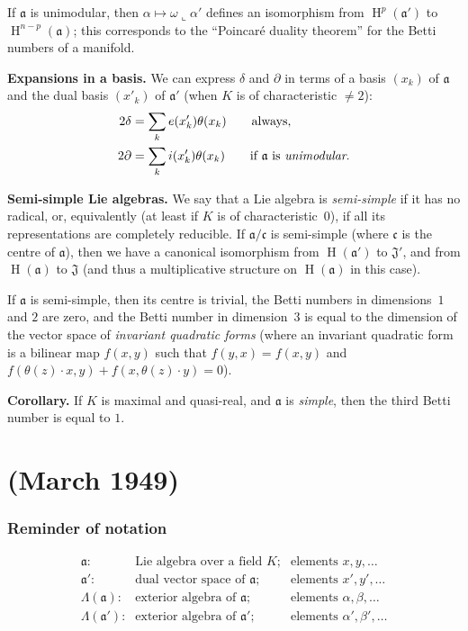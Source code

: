 \documentclass{article}
\newcommand{\llp}{\mathbin{\llcorner}}
\newcommand{\fk}{\mathfrak}
\DeclareMathOperator{\HH}{H}
\newcommand{\oldpage}[1]{\marginpar{\footnotesize$\Big\vert$ \textit{p.~#1}}}
\begin{document}
If $\fk{a}$ is unimodular, then $\alpha\mapsto\omega\llp\alpha'$ defines an isomorphism from $\HH^p(\fk{a}')$ to $\HH^{n-p}(\fk{a})$;
this corresponds to the ``Poincar\'{e} duality theorem'' for the Betti numbers of a manifold.

\medskip
\textbf{Expansions in a basis.}
We can express $\delta$ and $\partial$ in terms of a basis $(x_k)$ of $\fk{a}$ and the dual basis $(x'_k)$ of $\fk{a}'$ (when $K$ is of characteristic $\neq2$):
\[
  \begin{aligned}
    2\delta
    &= \sum_k e(x'_k)\theta(x_k)
    \qquad\mbox{always,}
  \\2\partial
    &= \sum_k i(x'_k)\theta(x_k)
    \qquad\mbox{if $\fk{a}$ is \emph{unimodular}.}
  \end{aligned}
\]

\medskip
\textbf{Semi-simple Lie algebras.}
We say that a Lie algebra is \emph{semi-simple} if it has no radical, or, equivalently (at least if $K$ is of characteristic~$0$), if all its representations are completely reducible.
If $\fk{a}/\fk{c}$ is semi-simple (where $\fk{c}$ is the centre of $\fk{a}$), then we have a canonical isomorphism from $\HH(\fk{a}')$ to $\fk{J}'$, and from $\HH(\fk{a})$ to $\fk{J}$ (and thus a multiplicative structure on $\HH(\fk{a})$ in this case).

If $\fk{a}$ is semi-simple, then its centre is trivial, the Betti numbers in dimensions~$1$ and $2$ are zero, and the Betti number in dimension~$3$ is equal to the dimension of the vector space of \emph{invariant quadratic forms} (where an invariant quadratic form is a bilinear map $f(x,y)$ such that $f(y,x)=f(x,y)$ and $f(\theta(z)\cdot x,y)+f(x,\theta(z)\cdot y)=0$).

\medskip
\textbf{Corollary.}
If $K$ is maximal and quasi-real, and $\fk{a}$ is \emph{simple}, then the third Betti number is equal to $1$.



\part{(March 1949)}
\label{II}

\oldpage{45}
\section{Reminder of notation}
\label{II.1}

\[
  \begin{array}{rll}
    \mbox{$\fk{a}$:} & \mbox{Lie algebra over a field $K$;} & \mbox{elements $x,y,\ldots$}
  \\\mbox{$\fk{a}'$:} & \mbox{dual vector space of $\fk{a}$;} & \mbox{elements $x',y',\ldots$}
  \\\mbox{$\Lambda(\fk{a})$:} & \mbox{exterior algebra of $\fk{a}$;} & \mbox{elements $\alpha,\beta,\ldots$}
  \\\mbox{$\Lambda(\fk{a}')$:} & \mbox{exterior algebra of $\fk{a}'$;} & \mbox{elements $\alpha',\beta',\ldots$}
  \end{array}
\]
\end{document}
